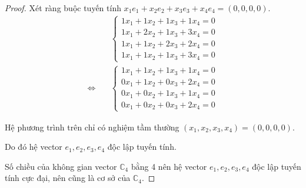 \begin{proof}Xét ràng buộc tuyến tính $x_{1}e_{1} + x_{2}e_{2} + x_{3}e_{3} + x_{4}e_{4} = (0,0,0,0)$.
    \begingroup
    \allowdisplaybreaks
    \begin{align*}
                             & \begin{cases}
                                   1x_{1} + 1x_{2} + 1x_{3} + 1x_{4} = 0 \\
                                   1x_{1} + 2x_{2} + 1x_{3} + 3x_{4} = 0 \\
                                   1x_{1} + 1x_{2} + 2x_{3} + 2x_{4} = 0 \\
                                   1x_{1} + 1x_{2} + 1x_{3} + 3x_{4} = 0
                               \end{cases} \\
        \Longleftrightarrow\quad &
        \begin{cases}
            1x_{1} + 1x_{2} + 1x_{3} + 1x_{4} = 0 \\
            0x_{1} + 1x_{2} + 0x_{3} + 2x_{4} = 0 \\
            0x_{1} + 0x_{2} + 1x_{3} + 1x_{4} = 0 \\
            0x_{1} + 0x_{2} + 0x_{3} + 2x_{4} = 0
        \end{cases}
    \end{align*}
    \endgroup

    Hệ phương trình trên chỉ có nghiệm tầm thường $(x_{1}, x_{2}, x_{3}, x_{4}) = (0, 0, 0, 0)$.
    
    Do đó hệ vector $e_{1}, e_{2}, e_{3}, e_{4}$ độc lập tuyến tính.
    
    Số chiều của không gian vector $\mathbb{C}_{4}$ bằng 4 nên hệ vector $e_{1}, e_{2}, e_{3}, e_{4}$ độc lập tuyến tính cực đại, nên cũng là cơ sở của $\mathbb{C}_{4}$.


\end{proof}
